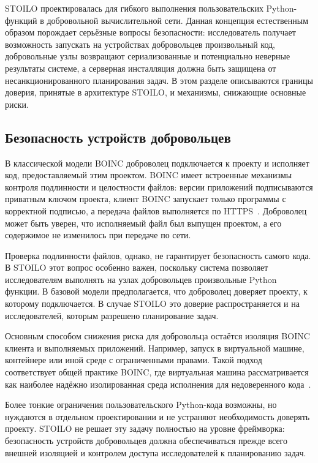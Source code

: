 \documentclass[a4paper,12pt]{extarticle}
\begin{document}
STOILO проектировалась для гибкого выполнения пользовательских Python-функций в добровольной вычислительной сети.
Данная концепция естественным образом порождает серьёзные вопросы безопасности: исследователь получает возможность запускать на устройствах добровольцев произвольный код, добровольные узлы возвращают сериализованные и потенциально неверные результаты системе, а серверная инсталляция должна быть защищена от несанкционированного планирования задач.
В этом разделе описываются границы доверия, принятые в архитектуре STOILO, и механизмы, снижающие основные риски.

\subsection{Безопасность устройств добровольцев}

В классической модели BOINC доброволец подключается к проекту и исполняет код, предоставляемый этим проектом.
BOINC имеет встроенные механизмы контроля подлинности и целостности файлов: версии приложений подписываются приватным ключом проекта, клиент BOINC запускает только программы с корректной подписью, а передача файлов выполняется по HTTPS~\cite{boinc_security,boinc_code_signing}.
Доброволец может быть уверен, что исполняемый файл был выпущен проектом, а его содержимое не изменилось при передаче по сети.

Проверка подлинности файлов, однако, не гарантирует безопасность самого кода.
В STOILO этот вопрос особенно важен, поскольку система позволяет исследователям выполнять на узлах добровольцев произвольные Python функции.
В базовой модели предполагается, что доброволец доверяет проекту, к которому подключается.
В случае STOILO это доверие распространяется и на исследователей, которым разрешено планирование задач.

Основным способом снижения риска для добровольца остаётся изоляция BOINC клиента и выполняемых приложений.
Например, запуск в виртуальной машине, контейнере или иной среде с ограниченными правами.
Такой подход соответствует общей практике BOINC, где виртуальная машина рассматривается как наиболее надёжно изолированная среда исполнения для недоверенного кода~\cite{boinc_vbox_apps}.

Более тонкие ограничения пользовательского Python-кода возможны, но нуждаются в отдельном проектировании и не устраняют необходимость доверять проекту.
STOILO не решает эту задачу полностью на уровне фреймворка: безопасность устройств добровольцев должна обеспечиваться прежде всего внешней изоляцией и контролем доступа исследователей к планированию задач.
\end{document}
